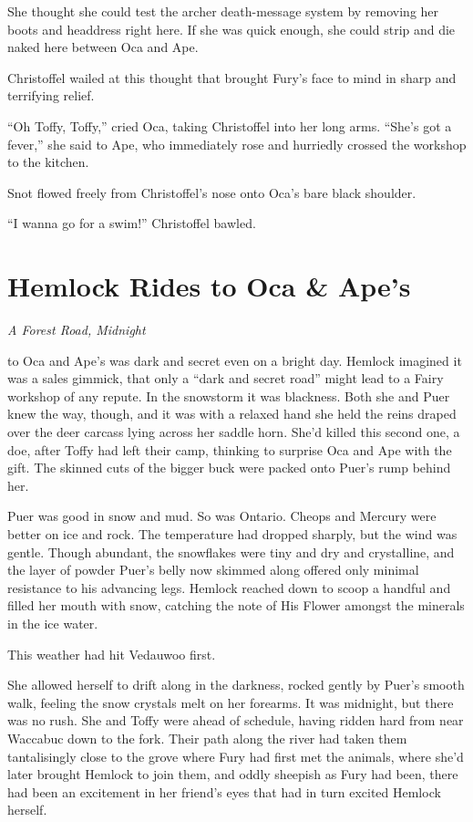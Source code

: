 \documentclass[11pt,a5paper]{article}
\newcommand{\alet}[1]{\textit{#1}\vspace{1em}}
\begin{document}
She thought she could test the archer death-message system by removing her boots and headdress right here. If she was quick enough, she could strip and die naked here between Oca and Ape.

Christoffel wailed at this thought that brought Fury's face to mind in sharp and terrifying relief.

``Oh Toffy, Toffy,'' cried Oca, taking Christoffel into her long arms. ``She's got a fever,'' she said to Ape, who immediately rose and hurriedly crossed the workshop to the kitchen.

Snot flowed freely from Christoffel's nose onto Oca's bare black shoulder.

``I wanna go for a swim!'' Christoffel bawled.

\newpage

\section{Hemlock Rides to Oca \& Ape's}

\alet{A Forest Road, Midnight}

 to Oca and Ape's was dark and secret even on a bright day. Hemlock imagined it was a sales gimmick, that only a ``dark and secret road'' might lead to a Fairy workshop of any repute. In the snowstorm it was blackness. Both she and Puer knew the way, though, and it was with a relaxed hand she held the reins draped over the deer carcass lying across her saddle horn. She'd killed this second one, a doe, after Toffy had left their camp, thinking to surprise Oca and Ape with the gift. The skinned cuts of the bigger buck were packed onto Puer's rump behind her.

Puer was good in snow and mud. So was Ontario. Cheops and Mercury were better on ice and rock. The temperature had dropped sharply, but the wind was gentle. Though abundant, the snowflakes were tiny and dry and crystalline, and the layer of powder Puer's belly now skimmed along offered only minimal resistance to his advancing legs. Hemlock reached down to scoop a handful and filled her mouth with snow, catching the note of His Flower amongst the minerals in the ice water.

This weather had hit Vedauwoo first.

She allowed herself to drift along in the darkness, rocked gently by Puer's smooth walk, feeling the snow crystals melt on her forearms. It was midnight, but there was no rush. She and Toffy were ahead of schedule, having ridden hard from near Waccabuc down to the fork. Their path along the river had taken them tantalisingly close to the grove where Fury had first met the animals, where she'd later brought Hemlock to join them, and oddly sheepish as Fury had been, there had been an excitement in her friend's eyes that had in turn excited Hemlock herself.
\end{document}
